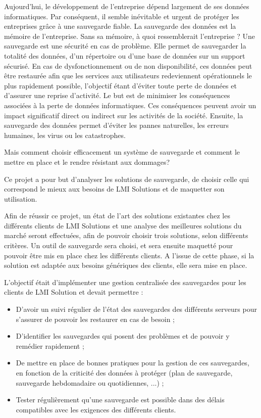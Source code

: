 \documentclass[pfe]{tnreport} %
\begin{document}
Aujourd'hui, le développement  de l'entreprise dépend largement de ses données informatiques. Par conséquent, il semble inévitable et urgent de protéger les entreprises grâce à une sauvegarde fiable. La sauvegarde des données est la mémoire de l'entreprise. Sans sa mémoire, à quoi ressemblerait l'entreprise ? \newline
Une sauvegarde est une sécurité en cas de problème.
Elle permet de sauvegarder la totalité des données, d’un répertoire ou d’une base de données sur un support sécurisé. \newline
En cas de dysfonctionnement ou de non disponibilité, ces données peut être restaurée afin que les services aux utilisateurs redeviennent opérationnels le plus rapidement possible, l’objectif étant d’éviter toute perte de données et d’assurer une reprise d’activité. \newline
Le but est de minimiser les conséquences associées à la perte de données informatiques. Ces conséquences peuvent avoir un impact significatif direct ou indirect sur les activités de la société. Ensuite, la sauvegarde des données permet d'éviter les pannes naturelles, les erreurs humaines, les virus ou les catastrophes.

Mais comment choisir efficacement un système de sauvegarde et comment le mettre en place et le rendre résistant aux dommages?

Ce projet a pour but d'analyser les solutions de sauvegarde, de choisir celle qui correspond le mieux aux besoins de LMI Solutions et de maquetter son utilisation.

Afin de réussir ce projet, un état de l'art des solutions existantes chez les différents clients de LMI Solutions et une analyse des meilleures solutions du marché seront effectuées, afin de pouvoir choisir trois solutions, selon différents critères. \newline
Un outil de sauvegarde sera choisi, et sera ensuite maquetté pour pouvoir être mis en place chez les différents clients.
A l'issue de cette phase, si la solution est adaptée aux besoins génériques des clients, elle sera mise en place.

L’objectif était d’implémenter une gestion centralisée des sauvegardes pour les clients de LMI Solution et devait permettre : \newline
\begin{itemize}
 \item D’avoir un suivi régulier de l’état des sauvegardes des différents serveurs pour 
s’assurer de pouvoir les restaurer en cas de besoin ; 
\item D’identifier les sauvegardes qui posent des problèmes et de pouvoir y remédier rapidement ;
\item De mettre en place de bonnes pratiques pour la gestion de ces sauvegardes, en 
fonction de la criticité des données à protéger (plan de sauvegarde, sauvegarde hebdomadaire ou
quotidiennes, ...) ;
\item Tester régulièrement qu'une sauvegarde est possible dans des délais compatibles avec les 
exigences des différents clients. \newline 
\end{itemize}
\end{document}

